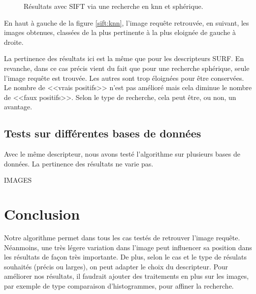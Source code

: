 \documentclass{article}
\begin{document}
\begin{figure}[!ht]%
  \centering
  \hspace{0.04\textwidth}
  \caption{Résultats avec SIFT via une recherche en knn et sphérique.}
  \label{sift}
\end{figure}

En haut à gauche de la figure \ref{sift:knn}, l'image requête retrouvée, en suivant, les images obtenues, classées de la plus pertinente à la plus eloignée de gauche à droite.

La pertinence des résultats ici est la même que pour les descripteurs SURF. En revanche, dans ce cas précis vient du fait que pour une recherche sphérique,
seule l'image requête est trouvée. Les autres sont trop éloignées pour être conservées. Le nombre de <<vrais
positifs>> n'est pas amélioré mais cela diminue 
le nombre de <<faux positifs>>. Selon le type de recherche, cela peut être, ou non, un avantage.


\subsection{Tests sur différentes bases de données}

Avec le même descripteur, nous avons testé l'algorithme sur plusieurs bases de données. La pertinence des résultats ne varie pas.

IMAGES


\section{Conclusion}

Notre algorithme permet dans tous les cas testés de retrouver l'image requête. Néanmoins, une très légere variation dans l'image peut influencer 
sa position dans les résultats de façon très importante. 
De plus, selon le cas et le type de résulats souhaités (précis ou larges), on peut adapter le choix du descripteur.
Pour améliorer nos résultats, il faudrait ajouter des traitements en plus sur les images, par exemple de type comparaison d'histogrammes, pour affiner la recherche.
\end{document}
